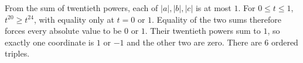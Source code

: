 From the sum of twentieth powers, each of $|a|,|b|,|c|$ is at most $1$. For $0\le t\le1$, $t^{20}\ge t^{24}$, with equality only at $t=0$ or $1$. Equality of the two sums therefore forces every absolute value to be $0$ or $1$. Their twentieth powers sum to $1$, so exactly one coordinate is $1$ or $-1$ and the other two are zero. There are $\boxed6$ ordered triples.
